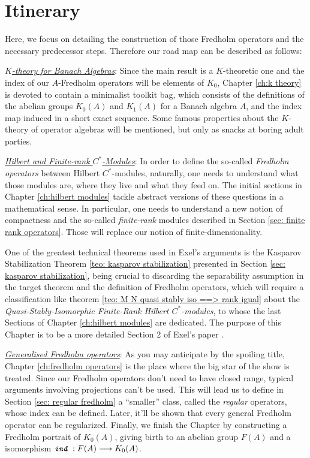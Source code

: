 \section*{Itinerary}
Here, we focus on detailing the construction of those Fredholm operators and the necessary predecessor steps. Therefore our road map can be described as follows:
\begin{itroman}
	\item \underline{\textit{$K$-theory for Banach Algebras}}: Since the main result is a $K$-theoretic one and the index of our $A$-Fredholm operators will be elements of $K_0$, Chapter \ref{ch:k theory} is devoted to contain a minimalist toolkit bag, which consists of the definitions of the abelian groups $K_0(A)$ and $K_1(A)$ for a Banach algebra $A$, and the index map induced in a short exact sequence. Some famous properties about the $K$-theory of operator algebras will be mentioned, but only as snacks at boring adult parties.
	\item \underline{\textit{Hilbert and Finite-rank \ensuremath{C^*}-Modules}}: In order to define the so-called \textit{Fredholm operators} between Hilbert $C^*$-modules, naturally, one needs to understand what those modules are, where they live and what they feed on. The initial sections in Chapter \ref{ch:hilbert modules} tackle abstract versions of these questions in a mathematical sense. In particular, one needs to understand a new notion of compactness and the so-called  \textit{finite-rank} modules described in Section \ref{sec: finite rank operators}. Those will replace our notion of finite-dimensionality. 
	
	One of the greatest technical theorems used in Exel's arguments is the Kasparov Stabilization Theorem \ref{teo: kasparov stabilization} presented in Section \ref{sec: kasparov stabilization}, being crucial to discarding the separability assumption in the target theorem and the definition of Fredholm operators, which will require a classification like theorem \ref{teo: M N quasi stably iso ==> rank igual} about the \textit{Quasi-Stably-Isomorphic Finite-Rank Hilbert $C^*$-modules}, to whose the last Sections of Chapter \ref{ch:hilbert modules} are dedicated. The purpose of this Chapter is to be a more detailed Section 2 of Exel's paper \cite{exel7fredholm}.
	
	\item \underline{\textit{Generalised Fredholm operators}}: As you may anticipate by the spoiling title, Chapter \ref{ch:fredholm operators} is the place where the big star of the show is treated. Since our Fredholm operators don't need to have closed range, typical arguments involving projections can't be used. This will lead us to define in Section \ref{sec: regular fredholm} a ``smaller'' class, called the \textit{regular} operators, whose index can be defined. Later, it'll be shown that every general Fredholm operator can be regularized. Finally, we finish the Chapter by constructing a Fredholm portrait of $K_0(A)$, giving birth to an abelian group $F(A)$ and a isomorphism $\texttt{\textit{ind}}\, : F(A) \longrightarrow K_0(A)$.
	

\end{itroman}
